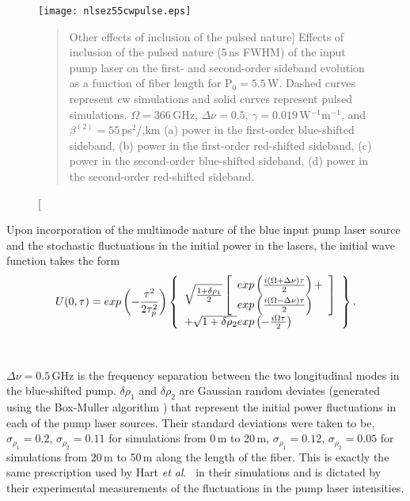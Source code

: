 \begin{figure}
\begin{center}
\texttt{[image: nlsez55cwpulse.eps]}
\end{center}
\renewcommand{\baselinestretch}{1}
\small\normalsize
\begin{quote}
\caption
[Other effects of inclusion of the pulsed nature]
{Effects of inclusion of the pulsed nature (5\,ns FWHM) of the input pump laser on the first- and second-order sideband evolution as a function of fiber length for P$_0 = 5.5$\,W. Dashed curves represent cw simulations and solid curves represent pulsed simulations. $\Omega = 366$\,GHz, $\Delta\nu = 0.5$, $\gamma = 0.019$\,W$^{-1}$m$^{-1}$, and $\beta^{(2)} = 55$\,ps$^2$/,km (a) power in the first-order blue-shifted sideband, (b) power in the first-order red-shifted sideband, (c) power in the second-order blue-shifted sideband, (d) power in the second-order red-shifted sideband.}
\label{fig2.5}
\end{quote}
\end{figure}
\renewcommand{\baselinestretch}{2}
\small\normalsize

Upon incorporation of the multimode nature of the blue input pump laser source
and the stochastic fluctuations in the initial power in the lasers, the
initial wave function takes the form
\begin {equation}
U(0,\tau) = exp\left( - {\tau^2 \over 2\tau_p^2} \right)
\left\{
\begin{array}{l}
\sqrt{{1 + \delta\rho_1 \over 2}}
\left[ \begin{array}{l}
exp \left( {i(\Omega+\Delta\nu)\tau \over 2} \right) + \\
exp \left( {i(\Omega-\Delta\nu)\tau \over 2} \right)
\end{array} \right]\\
+ \sqrt{1 + \delta\rho_2} exp\left( - {i\Omega\tau \over 2} \right)
\end{array}
\right\}.
\end{equation}

\

\noindent $\Delta\nu = 0.5$\,GHz is the frequency separation between the two longitudinal
modes in the blue-shifted pump. $\delta\rho_1$ and $\delta\rho_2$ are
Gaussian random deviates (generated using the Box-Muller algorithm
\cite{boxmuller}) that represent the initial power fluctuations in each of the
pump laser sources. Their standard deviations were taken to be,
$\sigma_{\rho_1} = 0.2$, $\sigma_{\rho_2} = 0.11$ for simulations from 0\,m to
20\,m, $\sigma_{\rho_1} = 0.12$, $\sigma_{\rho_2} = 0.05$ for simulations from
20\,m to 50\,m along the length of the fiber. This is exactly the same
prescription used by Hart {\it et al}.\ \cite{hart1} in their simulations and is
dictated by their experimental measurements of the fluctuations in the pump
laser intensities.

